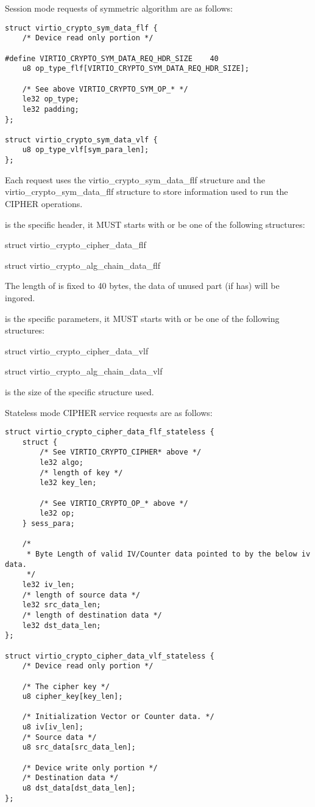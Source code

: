 Session mode requests of symmetric algorithm are as follows:

\begin{lstlisting}
struct virtio_crypto_sym_data_flf {
    /* Device read only portion */

#define VIRTIO_CRYPTO_SYM_DATA_REQ_HDR_SIZE    40
    u8 op_type_flf[VIRTIO_CRYPTO_SYM_DATA_REQ_HDR_SIZE];

    /* See above VIRTIO_CRYPTO_SYM_OP_* */
    le32 op_type;
    le32 padding;
};

struct virtio_crypto_sym_data_vlf {
    u8 op_type_vlf[sym_para_len];
};
\end{lstlisting}

Each request uses the virtio_crypto_sym_data_flf structure and the
virtio_crypto_sym_data_flf structure to store information used to run the
CIPHER operations.

 is the  specific header, it MUST starts
with or be one of the following structures:
\begin{itemize*}
\item struct virtio_crypto_cipher_data_flf
\item struct virtio_crypto_alg_chain_data_flf
\end{itemize*}

The length of  is fixed to 40 bytes, the data of unused
part (if has) will be ingored.

 is the  specific parameters, it MUST starts
with or be one of the following structures:
\begin{itemize*}
\item struct virtio_crypto_cipher_data_vlf
\item struct virtio_crypto_alg_chain_data_vlf
\end{itemize*}

 is the size of the specific structure used.

Stateless mode CIPHER service requests are as follows:

\begin{lstlisting}
struct virtio_crypto_cipher_data_flf_stateless {
    struct {
        /* See VIRTIO_CRYPTO_CIPHER* above */
        le32 algo;
        /* length of key */
        le32 key_len;

        /* See VIRTIO_CRYPTO_OP_* above */
        le32 op;
    } sess_para;

    /*
     * Byte Length of valid IV/Counter data pointed to by the below iv data.
     */
    le32 iv_len;
    /* length of source data */
    le32 src_data_len;
    /* length of destination data */
    le32 dst_data_len;
};

struct virtio_crypto_cipher_data_vlf_stateless {
    /* Device read only portion */

    /* The cipher key */
    u8 cipher_key[key_len];

    /* Initialization Vector or Counter data. */
    u8 iv[iv_len];
    /* Source data */
    u8 src_data[src_data_len];

    /* Device write only portion */
    /* Destination data */
    u8 dst_data[dst_data_len];
};
\end{lstlisting}

